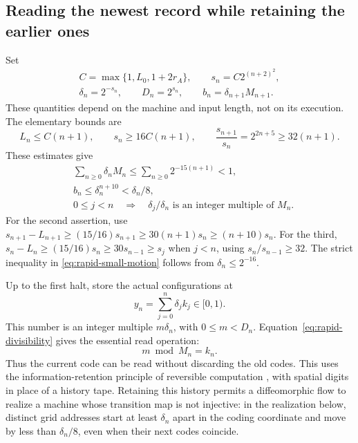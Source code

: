 \subsection{Reading the newest record while retaining the earlier ones}
Set
\begin{equation}
 \begin{gathered}
 C=\max\{1,L_0,1+2r_A\},\qquad s_n=C2^{(n+2)^2},\\
 \delta_n=2^{-s_n},\qquad D_n=2^{s_n},\qquad
 b_n=\delta_{n+1}M_{n+1}.
 \end{gathered}
 \label{eq:rapid-scales}
\end{equation}
These quantities depend on the machine and input length, not on its
execution. The elementary bounds are
\[
 L_n\leq C(n+1),\qquad
 s_n\geq16C(n+1),\qquad
 \frac{s_{n+1}}{s_n}=2^{2n+5}\geq32(n+1).
\]
These estimates give
\begin{align}
 &\sum_{n\geq0}\delta_n M_n
       \leq\sum_{n\geq0}2^{-15(n+1)}<1,
       \label{eq:rapid-total-memory}\\
 &b_n\leq\delta_n^{n+10}<\delta_n/8,
       \label{eq:rapid-small-motion}\\
 &0\leq j<n\quad\Longrightarrow\quad
       \delta_j/\delta_n\text{ is an integer multiple of }M_n.
       \label{eq:rapid-divisibility}
\end{align}
For the second assertion, use
$s_{n+1}-L_{n+1}\geq(15/16)s_{n+1}
\geq30(n+1)s_n\geq(n+10)s_n$.
For the third, $s_n-L_n\geq(15/16)s_n\geq30s_{n-1}\geq s_j$
when $j<n$, using $s_n/s_{n-1}\geq32$.
The strict inequality in \eqref{eq:rapid-small-motion} follows from
$\delta_n\leq2^{-16}$.

Up to the first halt, store the actual configurations at
\begin{equation}
 y_n=\sum_{j=0}^n\delta_j k_j\in[0,1).
 \label{eq:rapid-history}
\end{equation}
This number is an integer multiple $m\delta_n$, with $0\leq m<D_n$.
Equation~\eqref{eq:rapid-divisibility} gives the essential read operation:
\begin{equation}
 m\bmod M_n=k_n.
 \label{eq:rapid-read}
\end{equation}
Thus the current code can be read without discarding the old codes.
This uses the information-retention principle of reversible computation
\cite{Landauer,Bennett}, with spatial digits in place of a history tape.
Retaining this history permits a diffeomorphic flow to realize a machine
whose transition map is not injective: in the realization below, distinct
grid addresses start at least $\delta_n$ apart in the coding coordinate
and move by less than $\delta_n/8$, even when their next codes coincide.

